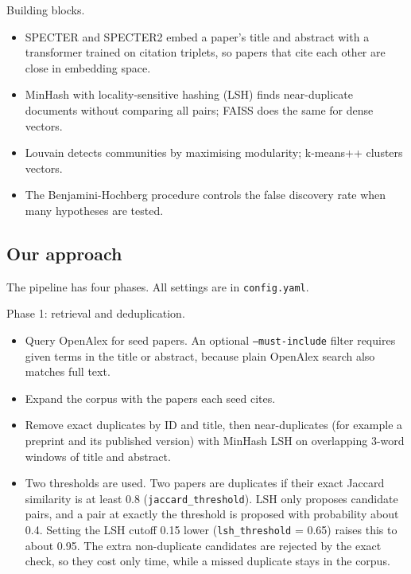 \documentclass[11pt,a4paper]{article}
\begin{document}
Building blocks.
\begin{itemize}
  \item SPECTER \cite{cohan2020specter} and SPECTER2 \cite{singh2023scirepeval} embed a paper's title and abstract with a transformer trained on citation triplets, so papers that cite each other are close in embedding space.
  \item MinHash \cite{broder1997resemblance} with locality-sensitive hashing (LSH) finds near-duplicate documents without comparing all pairs; FAISS \cite{johnson2019faiss} does the same for dense vectors.
  \item Louvain \cite{blondel2008louvain} detects communities by maximising modularity; k-means++ \cite{arthur2007kmeanspp} clusters vectors.
  \item The Benjamini-Hochberg procedure \cite{benjamini1995fdr} controls the false discovery rate when many hypotheses are tested.
\end{itemize}

\subsection{Our approach}

The pipeline has four phases. All settings are in \texttt{config.yaml}.

Phase 1: retrieval and deduplication.
\begin{itemize}
  \item Query OpenAlex for seed papers. An optional \texttt{--must-include} filter requires given terms in the title or abstract, because plain OpenAlex search also matches full text.
  \item Expand the corpus with the papers each seed cites.
  \item Remove exact duplicates by ID and title, then near-duplicates (for example a preprint and its published version) with MinHash LSH on overlapping 3-word windows of title and abstract.
  \item Two thresholds are used. Two papers are duplicates if their exact Jaccard similarity is at least 0.8 (\texttt{jaccard\_threshold}). LSH only proposes candidate pairs, and a pair at exactly the threshold is proposed with probability about 0.4. Setting the LSH cutoff 0.15 lower (\texttt{lsh\_threshold} = 0.65) raises this to about 0.95. The extra non-duplicate candidates are rejected by the exact check, so they cost only time, while a missed duplicate stays in the corpus.
\end{itemize}
\end{document}
